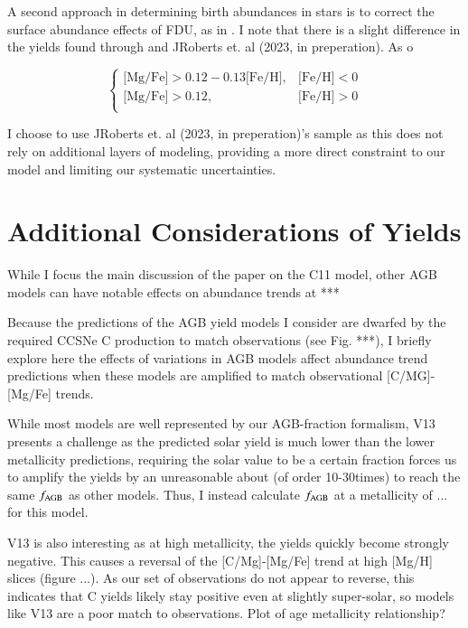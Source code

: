 \documentclass[12pt,oneside]{report}
\newcommand{\citetjack}{JRoberts et. al (2023, in preperation)}
\begin{document}
A second approach in determining birth abundances in stars is to correct the surface abundance effects of FDU, as in \cite{fiorenzo+21}. I note that there is a slight difference in the yields found through \cite{fiorenzo+21} and \citetjack. As o

\begin{equation}\label{eq:high_alpha}
\begin{cases}
\text{[Mg/Fe]} >0.12-0.13\text{[Fe/H]}, & \text{[Fe/H]}<0\\
\text{[Mg/Fe]} >0.12, & \text{[Fe/H]}>0\\
\end{cases}
\end{equation}



I choose to use \citetjack's sample as this does not rely on additional layers of modeling, providing a more direct constraint to our model and limiting our systematic uncertainties.

\newpage
\section{Additional Considerations of Yields}\label{sec:alt_agb}


While I focus the main discussion of the paper on the C11 model, other AGB models can have notable effects on abundance trends at ***

Because the predictions of the AGB yield models I consider are dwarfed by the
required CCSNe C production to match observations (see Fig. ***), I briefly explore here the effects of variations in AGB models affect abundance trend predictions when these models are amplified to match observational [C/MG]-[Mg/Fe] trends. 

While most models are well represented by our AGB-fraction formalism, V13 presents a challenge as the predicted solar yield is much lower than the lower metallicity predictions, requiring the solar value to be a certain fraction forces us to amplify the yields by an unreasonable about (of order 10-30times) to reach the same $f_{\rm AGB}$ as other models. Thus, I instead calculate $f_{\rm AGB}$ at a metallicity of ... for this model. 

V13 is also interesting as at high metallicity, the yields quickly become strongly negative. This causes a reversal of the [C/Mg]-[Mg/Fe] trend at high [Mg/H] slices (figure ...). As our set of observations do not appear to reverse, this indicates that C yields likely stay positive even at slightly super-solar, so models like V13 are a poor match to observations. 
Plot of age metallicity relationship?
\end{document}
